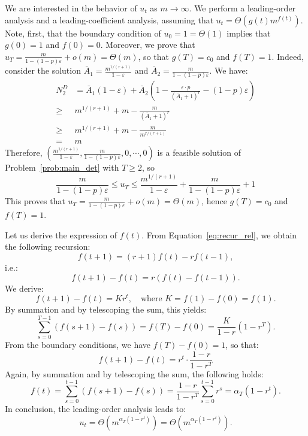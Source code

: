 \documentclass[blindrev]{informs3noheader}
\begin{document}
We are interested in the behavior of $u_t$ as $m \to \infty$. We perform a leading-order analysis and a leading-coefficient analysis, assuming that $u_t = \Theta(g(t)m^{f(t)})$. Note, first, that the boundary condition of $u_0=1=\Theta(1)$ implies that $g(0)=1$ and $f(0)=0$. Moreover, we prove that $u_T = \frac{m}{1-(1-p)\varepsilon} + o(m)=\Theta(m)$, so that $g(T)=c_0$ and $f(T)=1$. Indeed, consider the solution $\bar A_1=\frac{m^{1/(r+1)}}{1-\varepsilon}$ and $\bar A_2=\frac{m}{1-(1-p)\varepsilon} $. We have:
\begin{align*}
N^D_2 &=  \bar A_1(1-\varepsilon)+\bar A_2\left(1-\frac{\varepsilon\cdot p}{(\bar A_1+1)^{r}}-(1-p)\varepsilon\right)\\
\geq& m^{1/(r+1)} + m - \frac{m}{(\bar A_1+1)^{r}}\\
\geq& m^{1/(r+1)}+m-\frac{m}{m^{r/(r+1)}}\\
=& m
\end{align*}
Therefore, $\left(\frac{m^{1/(r+1)}}{1-\varepsilon},\frac{m}{1-(1-p)\varepsilon},0,\cdots,0\right)$ is a feasible solution of Problem~\eqref{prob:main_det} with $T\geq2$, so
$$\frac{m}{1-(1-p)\varepsilon}\leq u_T\leq \frac{m^{1/(r+1)}}{1-\varepsilon}+\frac{m}{1-(1-p)\varepsilon}+1$$
This proves that $u_T = \frac{m}{1-(1-p)\varepsilon} + o(m)=\Theta(m)$, hence $g(T)=c_0$ and $f(T)=1$.


Let us derive the expression of $f(t)$. From Equation~\eqref{eq:recur_rel}, we obtain the following recursion:
\[f(t+1) = (r+1)f(t)-rf(t-1),\]
i.e.:
\[f(t+1)-f(t) = r\left(f(t)-f(t-1)\right).\]
We derive:
$$f(t+1)-f(t)=Kr^t,\quad\text{where $K=f(1)-f(0)=f(1)$.}$$
By summation and by telescoping the sum, this yields:
$$\sum_{s=0}^{T-1}(f(s+1)-f(s))=f(T)-f(0)=\frac{K}{1-r}\left(1-r^T\right).$$
From the boundary conditions, we have $f(T)-f(0)=1$, so that:
$$f(t+1)-f(t)=r^{t}\cdot\frac{1-r}{1-r^T}$$
Again, by summation and by telescoping the sum, the following holds:
$$f(t)=\sum_{s=0}^{t-1}(f(s+1)-f(s))=\frac{1-r}{1-r^T}\sum_{s=0}^{t-1}r^s=\alpha_T(1-r^t).$$
In conclusion, the leading-order analysis leads to:
$$u_t=\Theta\left(m^{\alpha_T(1-r^t)}\right)=\Theta\left(m^{\alpha_T\left(1-r^t\right)}\right).$$
\end{document}

